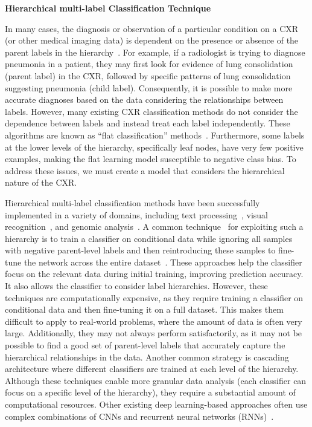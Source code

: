 \textbf{Hierarchical multi-label Classification Technique}

In many cases, the diagnosis or observation of a particular condition on a CXR (or other medical imaging data) is dependent on the presence or absence of the parent labels in the hierarchy~\cite{vaneeden_Relationship_2012}. For example, if a radiologist is trying to diagnose pneumonia in a patient, they may first look for evidence of lung consolidation (parent label) in the CXR, followed by specific patterns of lung consolidation suggesting pneumonia (child label). Consequently, it is possible to make more accurate diagnoses based on the data considering the relationships between labels. However, many existing CXR classification methods do not consider the dependence between labels and instead treat each label independently. These algorithms are known as ``flat classification'' methods~\cite{alaydie_Exploiting_2012}. Furthermore, some labels at the lower levels of the hierarchy, specifically leaf nodes, have very few positive examples, making the flat learning model susceptible to negative class bias. To address these issues, we must create a model that considers the hierarchical nature of the CXR\@.

Hierarchical multi-label classification methods have been successfully implemented in a variety of domains, including text processing~\cite{aly_Hierarchical_2019}, visual recognition~\cite{bi_Mandatory_2014}, and genomic analysis~\cite{bi_BayesOptimal_2015}. A common technique~\cite{chen_Deep_2019} for exploiting such a hierarchy is to train a classifier on conditional data while ignoring all samples with negative parent-level labels and then reintroducing these samples to fine-tune the network across the entire dataset~\cite{chen_Deep_2019}. These approaches help the classifier focus on the relevant data during initial training, improving prediction accuracy. It also allows the classifier to consider label hierarchies. However, these techniques are computationally expensive, as they require training a classifier on conditional data and then fine-tuning it on a full dataset. This makes them difficult to apply to real-world problems, where the amount of data is often very large. Additionally, they may not always perform satisfactorily, as it may not be possible to find a good set of parent-level labels that accurately capture the hierarchical relationships in the data. Another common strategy is cascading architecture where different classifiers are trained at each level of the hierarchy. Although these techniques enable more granular data analysis (each classifier can focus on a specific level of the hierarchy), they require a substantial amount of computational resources. Other existing deep learning-based approaches often use complex combinations of CNNs and recurrent neural networks (RNNs)~\cite{guo_CNNRNN_2018,kowsari_HDLTex_2017}.

